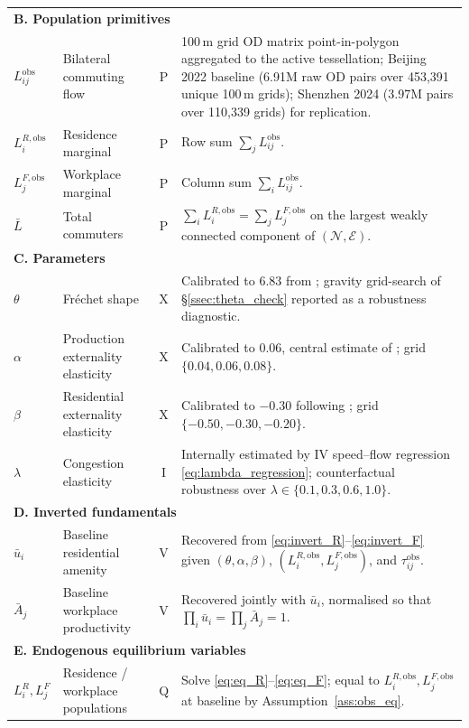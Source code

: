 \documentclass[12pt]{article}
\newcommand{\N}{\mathcal N}
\newcommand{\E}{\mathcal E}
\newcommand{\Lbar}{\bar L}
\newcommand{\ubar}{\bar u}
\newcommand{\Abar}{\bar A}
\newcommand{\tijk}{\tau_{ij}}
\newcommand{\obs}{\mathrm{obs}}
\begin{document}
\begin{small}
\begin{longtable}{p{2.0cm}p{4.4cm}cp{6.3cm}}
\midrule
\multicolumn{4}{l}{\textbf{B. Population primitives}}\\
$L_{ij}^{\obs}$ & Bilateral commuting flow & P & 100\,m grid OD matrix point-in-polygon aggregated to the active tessellation; Beijing 2022 baseline (6.91M raw OD pairs over 453{,}391 unique 100\,m grids); Shenzhen 2024 (3.97M pairs over 110{,}339 grids) for replication.\\
$L_i^{R,\obs}$ & Residence marginal & P & Row sum $\sum_j L_{ij}^{\obs}$.\\
$L_j^{F,\obs}$ & Workplace marginal & P & Column sum $\sum_i L_{ij}^{\obs}$.\\
$\Lbar$ & Total commuters & P & $\sum_i L_i^{R,\obs}=\sum_j L_j^{F,\obs}$ on the largest weakly connected component of $(\N,\E)$.\\
\midrule
\multicolumn{4}{l}{\textbf{C. Parameters}}\\
$\theta$ & Fr\'echet shape & X & Calibrated to $6.83$ from \citet{Ahlfeldt2015}; gravity grid-search of \S\ref{ssec:theta_check} reported as a robustness diagnostic.\\
$\alpha$ & Production externality elasticity & X & Calibrated to $0.06$, central estimate of \citet{CombesGobillon2015}; grid $\{0.04,0.06,0.08\}$.\\
$\beta$ & Residential externality elasticity & X & Calibrated to $-0.30$ following \citet{AllenArkolakis2014,MonteReddingRossiHansberg2018,HeblichReddingSturm2020}; grid $\{-0.50,-0.30,-0.20\}$.\\
$\lambda$ & Congestion elasticity & I & Internally estimated by IV speed--flow regression \eqref{eq:lambda_regression}; counterfactual robustness over $\lambda\in\{0.1,0.3,0.6,1.0\}$.\\
\midrule
\multicolumn{4}{l}{\textbf{D. Inverted fundamentals}}\\
$\ubar_i$ & Baseline residential amenity & V & Recovered from \eqref{eq:invert_R}--\eqref{eq:invert_F} given $(\theta,\alpha,\beta)$, $(L_i^{R,\obs},L_j^{F,\obs})$, and $\tijk^{\obs}$.\\
$\Abar_j$ & Baseline workplace productivity & V & Recovered jointly with $\ubar_i$, normalised so that $\prod_i\ubar_i=\prod_j\Abar_j=1$.\\
\midrule
\multicolumn{4}{l}{\textbf{E. Endogenous equilibrium variables}}\\
$L_i^R, L_j^F$ & Residence / workplace populations & Q & Solve \eqref{eq:eq_R}--\eqref{eq:eq_F}; equal to $L_i^{R,\obs},L_j^{F,\obs}$ at baseline by Assumption~\ref{ass:obs_eq}.\\

\end{longtable}
\end{small}
\end{document}
